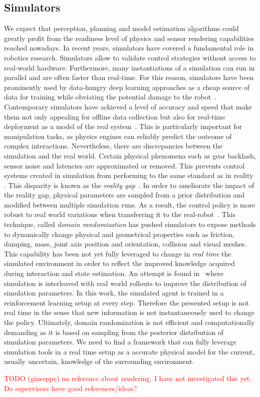 \subsection{Simulators}
We expect that perception, planning and model estimation algorithms could greatly profit from the readiness level of physics and sensor rendering capabilities reached nowadays.  
In recent years, simulators have covered a fundamental role in robotics research. Simulators allow to validate control strategies without access to real-world hardware. Furthermore, many instantiations of a simulation can run in parallel and are often faster than real-time.  For this reason, simulators have been prominently used by data-hungry deep learning approaches as a cheap source of data for training while obviating the potential damage to the robot~\cite{liang_gpu-accelerated_2018}.
Contemporary simulators have achieved a level of accuracy and speed that make them not only appealing for offline data collection but also for real-time deployment as a model of the real system~\cite{sim-benchmarks}. This is particularly important for manipulation tasks, as physics engines can reliably predict the outcome of complex interactions.  Nevertheless, there are discrepancies between the simulation and the real world. Certain physical phenomena such as gear backlash, sensor noise and latencies are approximated or removed. This prevents control systems created in simulation from performing to the same standard as in reality \cite{collins_benchmarking_2020}. This disparity is known as the \emph{reality gap}~\cite{hofer2021sim2real}. In order to ameliorate the impact of the reality gap, physical parameters are sampled from a prior distribution and modified between multiple simulation runs. As a result, the control policy is more robust to real world variations when transferring it to the real-robot~\cite{andrychowicz2020learning}. This technique, called \emph{domain randomization} has pushed simulators to expose methods to dynamically change physical and geometrical properties such as friction, damping, mass, joint axis position and orientation, collision and visual meshes. This capability has been not yet fully leveraged to change in \emph{real time} the simulated environment in order to reflect the improved knowledge acquired during interaction and state estimation. An attempt is found in~\cite{chebotar2019closing} where simulation is interleaved with real world rollouts to improve the distribution of simulation parameters. In this work, the simulated agent is trained in a reinforcement learning setup at every step. Therefore the presented setup is not real time in the sense that new information is not instantaneously used to change the policy. Ultimately, domain randomization is not efficient and computationally demanding as it is based on sampling from the posterior distribution of simulation parameters. We need to find a framework that can fully leverage simulation tools in a real time setup as a accurate physical model for the current, usually uncertain, knowledge of the surrounding environment.

\textcolor{red}{TODO (giuseppe) no reference about rendering. I have not investigated this yet. Do supervisors have good references/ideas?}